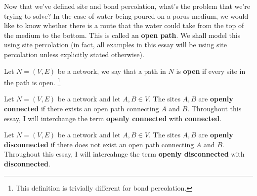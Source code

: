 

Now that we've defined site and bond percolation, what's the problem that we're trying to solve? In the case of water being poured on a porus medium, we would like to know
whether there is a route that the water could take from the top of the medium to the bottom. This is called an \textbf{open path}. We shall model this using site percolation (in fact, all examples in this essay will be using site
percolation unless explicitly stated otherwise).

\begin{definition}\label{def:open path}
  Let $N = (V, E)$ be a network, we say that a path in $N$ is \textbf{open} if every site in the path is open. \footnote{This definition is trivially different for bond
  percolation.}
\end{definition}

\begin{definition}\label{def:openly connected}
  Let $N=(V, E)$ be a network and let $A, B \in V$. The sites $A, B$ are \textbf{openly connected} if there exists an open path connecting $A$ and $B$. Throughout this essay, I
  will interchange the term \textbf{openly connected} with \textbf{connected}.
\end{definition}

\begin{definition}\label{def:openly disconnected}
  Let $N=(V, E)$ be a network and let $A, B \in V$. The sites $A, B$ are \textbf{openly disconnected} if there does not exist an open path connecting $A$ and
  $B$. Throughout this essay, I will intercahnge the term \textbf{openly disconnected} with \textbf{disconnected}. %
\end{definition}

